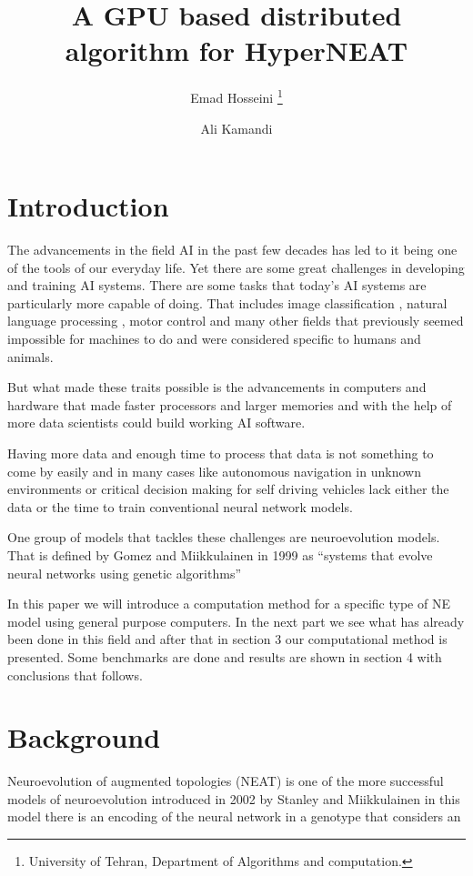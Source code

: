\documentclass[twocolumn]{article}
\title{A GPU based distributed algorithm for HyperNEAT}
\author{Emad Hosseini \thanks{University of Tehran, 
Department of Algorithms and computation.} 
\and Ali Kamandi}
\begin{document}
\maketitle


\section{Introduction}
The advancements in the field AI in the past few decades
has led to it being one of the tools of our everyday
life. Yet there are some great challenges in developing
and training AI systems. There are some tasks that
today's AI systems are particularly more capable of
doing. That includes image classification 
\cite{DeepImageClassificationReview}, natural
language processing \cite{NLPReview}, motor control
\cite{DeepRlforMotorControl} and many other fields
that previously seemed impossible for machines to do
and were considered specific to humans and animals.

But what made these traits possible is the advancements
in computers and hardware that made faster processors and
larger memories and with the help of more data scientists
could build working AI software.

Having more data and enough time to process that data is
not something to come by easily and in many cases like 
autonomous navigation in unknown environments or critical 
decision making for self driving vehicles lack either 
the data or the time to train conventional neural network 
models.

One group of models that tackles these challenges are
neuroevolution models. That is defined by Gomez and 
Miikkulainen in 1999 as ``systems that evolve neural 
networks using genetic algorithms''
\cite{NEDefenitionMiikkulainen}

In this paper we will introduce a computation method
for a specific type of NE model using general purpose
computers. In the next part we see what has already
been done in this field and after that in section 3
our computational method is presented. Some benchmarks
are done and results are shown in section 4 with 
conclusions that follows.


\section{Background}
Neuroevolution of augmented topologies (NEAT) is one
of the more successful models of neuroevolution
introduced in 2002 by Stanley and Miikkulainen
\cite{originalNEAT} in this model there is an encoding
of the neural network in a genotype that considers
an 
\end{document}
